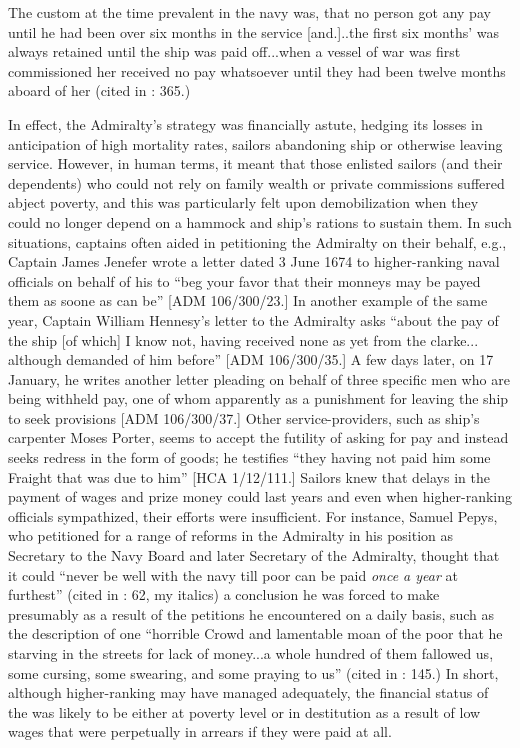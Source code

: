 The custom at the time prevalent in the navy was, that no person got any pay until he had been over six months in the service [and.]..the first six months’ was always retained until the ship was paid off...when a vessel of war was first commissioned her  received no pay whatsoever until they had been twelve months aboard of her (cited in \citealt{AdkinsAdkins2008}: 365.)

In effect, the Admiralty’s strategy was financially astute, hedging its losses in anticipation of high mortality rates, sailors abandoning ship or otherwise leaving service. However, in human terms, it meant that those enlisted sailors (and their dependents) who could not rely on family wealth or private commissions suffered abject poverty, and this was particularly felt upon demobilization when they could no longer depend on a hammock and ship’s rations to sustain them. In such situations, captains often aided in petitioning the Admiralty on their behalf, e.g., Captain James Jenefer wrote a letter dated 3 June {1674} to higher-ranking naval officials on behalf of his  to “beg your favor that their monneys may be payed them as soone as can be” [ADM 106/300/23.] In another example of the same year, Captain William Hennesy’s letter to the Admiralty asks “about the pay of the ship [of which] I know not, having received none as yet from the clarke... although demanded of him before” [ADM 106/300/35.] A few days later, on 17 January, he writes another letter pleading on behalf of three specific men who are being withheld pay, one of whom apparently as a punishment for leaving the ship to seek provisions [ADM 106/300/37.] Other service-providers, such as ship’s carpenter Moses Porter, seems to accept the futility of asking for pay and instead seeks redress in the form of goods; he testifies “they having not paid him some Fraight that was due to him” [HCA 1/12/111.] Sailors knew that delays in the payment of wages and prize money could last years and even when higher-ranking officials sympathized, their efforts were insufficient. For instance, Samuel Pepys, who petitioned for a range of reforms in the Admiralty in his position as Secretary to the Navy Board and later Secretary of the Admiralty, thought that it could  “never be well with the navy till poor  can be paid \textit{once a year} at furthest” (cited in \citealt{Palmer1986}: 62, my italics) a conclusion he was forced to make presumably as a result of the petitions he encountered on a daily basis, such as the description of one “horrible Crowd and lamentable moan of the poor  that he starving in the streets for lack of money...a whole hundred of them fallowed us, some cursing, some swearing, and some praying to us” (cited in \citealt{Lincoln2015}: 145.) In short, although higher-ranking  may have managed adequately, the financial status of the  was likely to be either at poverty level or in destitution as a result of low wages that were perpetually in arrears if they were paid at all.  

